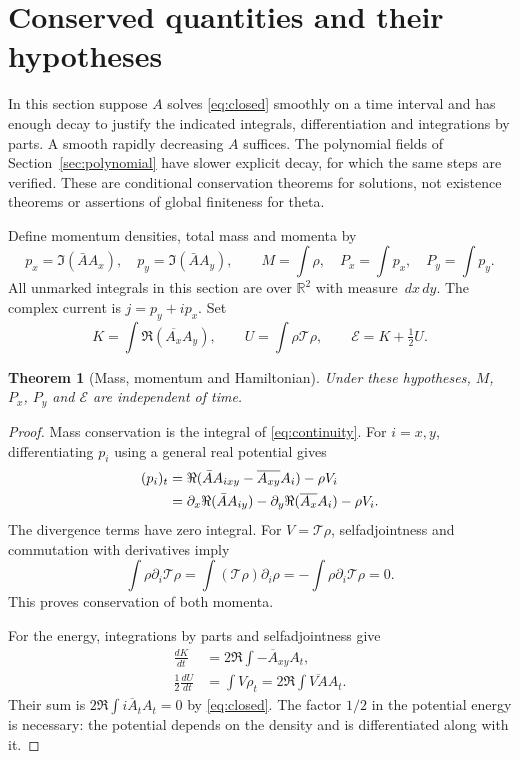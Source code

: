 \documentclass[11pt]{article}
\newcommand{\R}{\mathbb R}
\newcommand{\dd}{\,d}
\newcommand{\cT}{\mathcal T}
\newcommand{\cE}{\mathcal E}
\newtheorem{theorem}{Theorem}[section]
\theoremstyle{definition}
\theoremstyle{remark}
\begin{document}
\section{Conserved quantities and their hypotheses}
\label{sec:conservation}

In this section suppose $A$ solves \eqref{eq:closed} smoothly on a
time interval and has enough decay to justify the indicated integrals,
differentiation and integrations by parts. A smooth rapidly decreasing
$A$ suffices. The polynomial fields of Section~\ref{sec:polynomial}
have slower explicit decay, for which the same steps are verified.
These are conditional conservation theorems for solutions, not
existence theorems or assertions of global finiteness for theta.

Define momentum densities, total mass and momenta by
\begin{equation}
 p_x=\Im(\bar A A_x),\quad p_y=\Im(\bar A A_y),\qquad
 M=\int\rho,\quad P_x=\int p_x,\quad P_y=\int p_y.
 \label{eq:charges}
\end{equation}
All unmarked integrals in this section are over $\R^2$ with measure
$\dd x\dd y$. The complex current is $j=p_y+ip_x$.
Set
\begin{equation}
 K=\int\Re(\overline{A_x}A_y),\qquad
 U=\int\rho\cT\rho,\qquad
 \boxed{\cE=K+\tfrac12U.} \label{eq:energy}
\end{equation}

\begin{theorem}[Mass, momentum and Hamiltonian]
\label{thm:conservation}
Under these hypotheses, $M$, $P_x$, $P_y$ and $\cE$ are independent
of time.
\end{theorem}
\begin{proof}
Mass conservation is the integral of \eqref{eq:continuity}.
For $i=x,y$, differentiating $p_i$ using a general real potential gives
\begin{align}
 (p_i)_t
 &=\Re(\bar A A_{ixy}-\overline{A_{xy}}A_i)-\rho V_i\notag\\
 &=\partial_x\Re(\bar A A_{iy})
   -\partial_y\Re(\overline{A_x}A_i)-\rho V_i.
 \label{eq:momentumlocal}
\end{align}
The divergence terms have zero integral. For $V=\cT\rho$,
selfadjointness and commutation with derivatives imply
\[
 \int\rho\partial_i\cT\rho
 =\int(\cT\rho)\partial_i\rho
 =-\int\rho\partial_i\cT\rho=0.
\]
This proves conservation of both momenta.

For the energy, integrations by parts and selfadjointness give
\begin{align*}
 \frac{dK}{dt}&=2\Re\int\overline{-A_{xy}}A_t,\\
 \frac12\frac{dU}{dt}
 &=\int V\rho_t=2\Re\int\overline{VA}A_t.
\end{align*}
Their sum is $2\Re\int\overline{iA_t}A_t=0$ by
\eqref{eq:closed}. The factor $1/2$ in the potential energy is
necessary: the potential depends on the density and is differentiated
along with it.
\end{proof}
\end{document}
